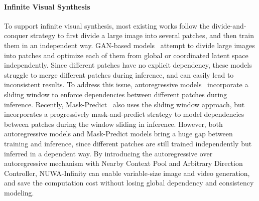 \documentclass{article}
\begin{document}
\paragraph{Infinite Visual Synthesis}
To support infinite visual synthesis, most existing works follow the divide-and-conquer strategy to first divide a large image into several patches, and then train them in an independent way. GAN-based models~\cite{struskiLocoGANLocallyConvolutional2022,skorokhodovAligningLatentImage2021} attempt to divide large images into patches and optimize each of them from global or coordinated latent space independently. Since different patches have no explicit dependency, these models struggle to merge different patches during inference, and can easily lead to inconsistent results. To address this issue, autoregressive models~\cite{esserTamingTransformersHighResolution2021,changMaskGITMaskedGenerative2022} incorporate a sliding window to enforce dependencies between different patches during inference. Recently, Mask-Predict~\cite{choXLXMERTPaintCaption2020, zhangM6ufcUnifyingMultimodal2021, changMaskGITMaskedGenerative2022} also uses the sliding window approach, but incorporates a progressively mask-and-predict strategy to model dependencies between patches during the window sliding in inference. However, both autoregressive models and Mask-Predict models bring a huge gap between training and inference, since different patches are still trained independently but inferred in a dependent way. By introducing the autoregressive over autoregressive mechanism with Nearby Context Pool and Arbitrary Direction Controller, NUWA-Infinity can enable variable-size image and video generation, and save the computation cost without losing global dependency and consistency modeling.

\end{document}
